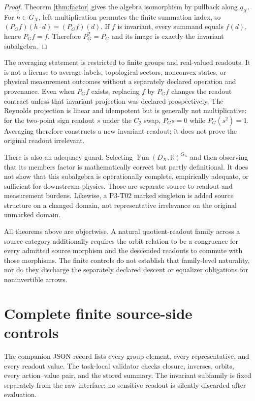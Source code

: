 \documentclass[11pt]{article}
\theoremstyle{definition}
\newcommand{\Fun}{\operatorname{Fun}}
\begin{document}
\begin{proof}
Theorem \ref{thm:factor} gives the algebra isomorphism by pullback along
$q_X$.  For $h\in G_X$, left multiplication permutes the finite summation
index, so $(P_Gf)(h\cdot d)=(P_Gf)(d)$.  If $f$ is invariant, every summand
equals $f(d)$, hence $P_Gf=f$.  Therefore $P_G^2=P_G$ and its image is exactly
the invariant subalgebra.
\end{proof}

The averaging statement is restricted to finite groups and real-valued
readouts.  It is not a license to average labels, topological sectors,
nonconvex states, or physical measurement outcomes without a separately
declared operation and provenance.  Even when $P_Gf$ exists, replacing $f$
by $P_Gf$ changes the readout contract unless that invariant projection was
declared prospectively.  The Reynolds projection is linear and idempotent but
is generally not multiplicative: for the two-point sign readout $s$ under the
$C_2$ swap, $P_Gs=0$ while $P_G(s^2)=1$.  Averaging therefore constructs a
new invariant readout; it does not prove the original readout irrelevant.

There is also an adequacy guard.  Selecting
$\Fun(D_X,\mathbb R)^{G_X}$ and then observing that its members factor is
mathematically correct but partly definitional.  It does not show that this
subalgebra is operationally complete, empirically adequate, or sufficient for
downstream physics.  Those are separate source-to-readout and measurement
burdens.  Likewise, a P3-T02 marked singleton is added source structure on a
changed domain, not representative irrelevance on the original unmarked
domain.

All theorems above are objectwise.  A natural quotient-readout family across
a source category additionally requires the orbit relation to be a congruence
for every admitted source morphism and the descended readouts to commute with
those morphisms.  The finite controls do not establish that family-level
naturality, nor do they discharge the separately declared descent or
equalizer obligations for noninvertible arrows.

\section{Complete finite source-side controls}

The companion JSON record lists every group element, every representative,
and every readout value.  The task-local validator checks closure, inverses,
orbits, every action--value pair, and the stored summary.  The invariant
subfamily is fixed separately from the raw interface; no sensitive readout is
silently discarded after evaluation.
\end{document}
